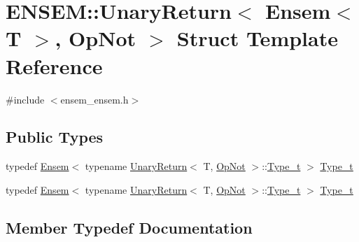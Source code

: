 \hypertarget{structENSEM_1_1UnaryReturn_3_01Ensem_3_01T_01_4_00_01OpNot_01_4}{}\section{E\+N\+S\+EM\+:\+:Unary\+Return$<$ Ensem$<$ T $>$, Op\+Not $>$ Struct Template Reference}
\label{structENSEM_1_1UnaryReturn_3_01Ensem_3_01T_01_4_00_01OpNot_01_4}


{\ttfamily \#include $<$ensem\+\_\+ensem.\+h$>$}

\subsection*{Public Types}
\begin{DoxyCompactItemize}
\item 
typedef \mbox{\hyperlink{classENSEM_1_1Ensem}{Ensem}}$<$ typename \mbox{\hyperlink{structENSEM_1_1UnaryReturn}{Unary\+Return}}$<$ T, \mbox{\hyperlink{structENSEM_1_1OpNot}{Op\+Not}} $>$\+::\mbox{\hyperlink{structENSEM_1_1UnaryReturn_3_01Ensem_3_01T_01_4_00_01OpNot_01_4_a858a31d9b2f5ae17601e7f83f0a58f5a}{Type\+\_\+t}} $>$ \mbox{\hyperlink{structENSEM_1_1UnaryReturn_3_01Ensem_3_01T_01_4_00_01OpNot_01_4_a858a31d9b2f5ae17601e7f83f0a58f5a}{Type\+\_\+t}}
\item 
typedef \mbox{\hyperlink{classENSEM_1_1Ensem}{Ensem}}$<$ typename \mbox{\hyperlink{structENSEM_1_1UnaryReturn}{Unary\+Return}}$<$ T, \mbox{\hyperlink{structENSEM_1_1OpNot}{Op\+Not}} $>$\+::\mbox{\hyperlink{structENSEM_1_1UnaryReturn_3_01Ensem_3_01T_01_4_00_01OpNot_01_4_a858a31d9b2f5ae17601e7f83f0a58f5a}{Type\+\_\+t}} $>$ \mbox{\hyperlink{structENSEM_1_1UnaryReturn_3_01Ensem_3_01T_01_4_00_01OpNot_01_4_a858a31d9b2f5ae17601e7f83f0a58f5a}{Type\+\_\+t}}
\end{DoxyCompactItemize}


\subsection{Member Typedef Documentation}
\mbox{\label{structENSEM_1_1UnaryReturn_3_01Ensem_3_01T_01_4_00_01OpNot_01_4_a858a31d9b2f5ae17601e7f83f0a58f5a}} 
